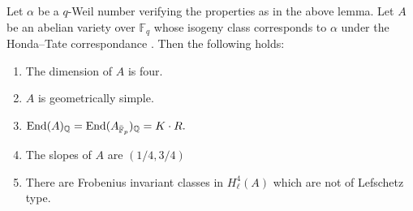 \begin{lemma}
\notready\label{elche}
Let $\alpha$ be a $q$-Weil number verifying the properties as in the above lemma. Let $A$ be an abelian variety over $\mathbb{F}_{q}$ whose isogeny class  corresponds to $\alpha$ under the Honda--Tate correspondance \cite{TateBour}. Then the following holds:
\begin{enumerate}
\item  The dimension of $A$ is four.
\item  $A$ is geometrically simple.
\item $\textnormal{End} (A)_{\mathbb{Q}} = \textnormal{End} (A_{\bar{\mathbb{F}}_p})_{\mathbb{Q}} = K \cdot R.$
\item The slopes of $A$ are $(1/4,3/4)$
\item There are Frobenius invariant classes in $H_\ell^4(A)$ which are not of Lefschetz type.
\end{enumerate}
\end{lemma}

